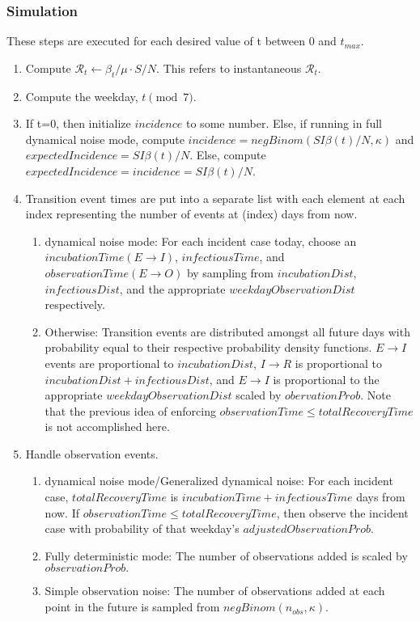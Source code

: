 \documentclass{article}
\newcommand{\nR}{\mathscr{R}}
\begin{document}
\subsubsection{Simulation}
These steps are executed for each desired value of t between 0 and $t_{max}$.
\begin{enumerate}
    \item Compute $\nR_t \gets \beta_t/\mu \cdot S/N$. This refers to instantaneous $\nR_t$.
    
    \item Compute the weekday, $t \pmod 7$.
    
    \item If t=0, then initialize $incidence$ to some number. Else, if running in full dynamical noise mode, compute $incidence = negBinom(SI\beta(t)/N, \kappa)$ and $expectedIncidence = SI\beta(t)/N$. Else, compute $expectedIncidence = incidence = SI\beta(t)/N$.
    
    \item Transition event times are put into a separate list with each element at each index representing the number of events at (index) days from now. 
        \begin{enumerate}
            \item dynamical noise mode: For each incident case today, choose an \linebreak $incubationTime (E \rightarrow I)$, $infectiousTime$, and $observationTime (E \rightarrow O)$ by sampling from $incubationDist$, $infectiousDist$, and the appropriate $weekdayObservationDist$ respectively. 
            
            \item Otherwise: Transition events are distributed amongst all future days with probability equal to their respective probability density functions. $E \rightarrow I$ events are proportional to $incubationDist$, $I \rightarrow R$ is proportional to $incubationDist + infectiousDist$, and $E \rightarrow I$ is proportional to the appropriate $weekdayObservationDist$ scaled by $obervationProb$. Note that the previous idea of enforcing \linebreak $observationTime \leq totalRecoveryTime$ is not accomplished here.

        \end{enumerate}

    \item Handle observation events.
        \begin{enumerate}
            \item dynamical noise mode/Generalized dynamical noise: For each incident case, $totalRecoveryTime$ is $incubationTime + infectiousTime$ days from now. If $observationTime \leq totalRecoveryTime$, then observe the incident case with probability of that weekday's \linebreak $adjustedObservationProb$. 
            \item Fully deterministic mode: The number of observations added is scaled by $observationProb.$
            \item Simple observation noise: The number of observations added at each point in the future is sampled from $negBinom(n_{obs}, \kappa)$.


\end{enumerate}
\end{enumerate}
\end{document}
